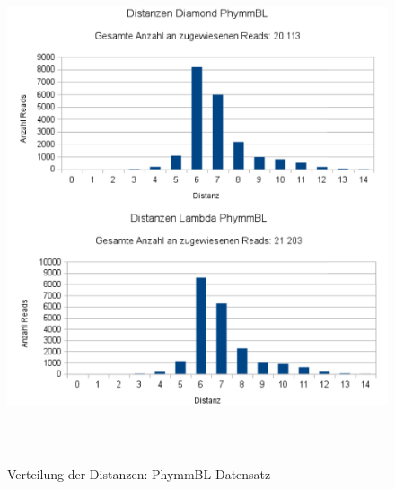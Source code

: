 \documentclass[10pt, a4paper]{article}[08.12.2015]
\begin{document}
     \begin{figure}[H]
      \centering
      \noindent\includegraphics[width=\linewidth,height=15cm,
      keepaspectratio]{Abbildungen/PhymmBL_Distanzen_both.png}
      \caption{Verteilung der Distanzen: PhymmBL Datensatz}
    \end{figure}
    
\end{document}
